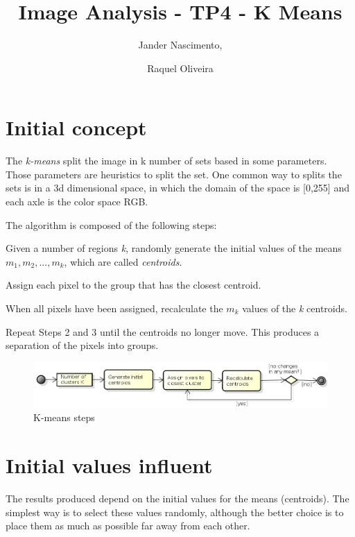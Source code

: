 \documentclass{article}
\newcounter{qcounter}
\begin{document}
\title{Image Analysis - TP4 - K Means}

\author{Jander Nascimento, 
\and Raquel Oliveira}

\maketitle

\section{Initial concept}

The \emph{k-means} split the image in k number of sets based in some parameters. Those parameters are heuristics to split the set. One common way to splits the sets is in a 3d dimensional space, in which the domain of the space is [0,255] and each axle is the color space RGB. 

The algorithm is composed of the following steps:
\begin{list}{:~}{}
\item Given a number of regions \emph{k}, randomly generate the initial values of the means $m_1, m_2, ..., m_k$, which are called \emph{centroids}.
\item Assign each pixel to the group that has the closest centroid.
\item When all pixels have been assigned, recalculate the $m_k$ values of the \emph{k} centroids.
\item Repeat Steps 2 and 3 until the centroids no longer move. This produces a separation of the pixels into groups.
\end{list}

\begin{figure}[H]
\centering
\includegraphics[width=1.0\textwidth]{../image/ActivityDiagram.png}
\caption{K-means steps}
\label{fig:kmeans}
\end{figure}

\section{Initial values influent}

The results produced depend on the initial values for the means (centroids). The simplest way is to select these values randomly, although the better choice is to place them as much as possible far away from each other.
\end{document}
